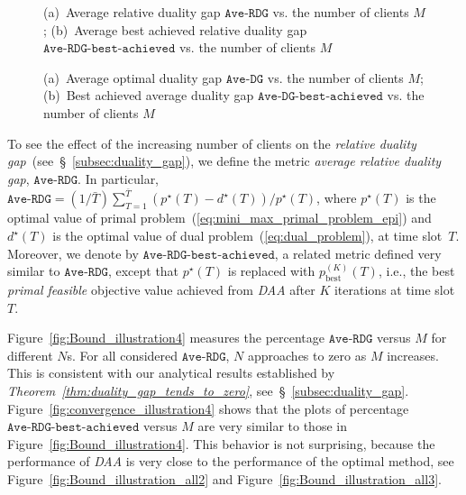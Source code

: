 \documentclass[journal, 10pt, twocolumn]{IEEEtran}
\begin{document}
\begin{figure}[t]
\centering
{}
\goodgap
{}\vspace{-2mm}
\caption{(a)~Average relative duality gap $\texttt{Ave-RDG}$ vs. the number of clients $M$; (b)~Average best achieved relative duality gap $\texttt{Ave-RDG-best-achieved}$ vs. the number of clients $M$}
\label{fig:Bound_illustration_all4}
\vspace{-0.4cm}
\end{figure}
\begin{figure}[t]
\centering
{}
\goodgap
{}\vspace{-2mm}
\caption{(a)~Average optimal duality gap $\texttt{Ave-DG}$ vs. the number of clients $M$; (b)~Best achieved average duality gap $\texttt{Ave-DG-best-achieved}$ vs. the number of clients $M$}
\label{fig:Bound_illustration_all5}
\vspace{-0.4cm}
\end{figure}

To see the effect of the increasing number of clients on the \emph{relative duality gap}~(see~\S~\ref{subsec:duality_gap}), we define the metric \emph{average relative duality gap}, $\texttt{Ave-RDG}$. In particular, $\texttt{Ave-RDG}= (1/\bar T)\sum_{T=1}^{\bar T}(p^\star(T)-d^\star(T))/p^\star(T)$, where $p^\star(T)$ is the optimal value of primal problem~(\ref{eq:mini_max_primal_problem_epi}) and $d^\star(T)$ is the optimal value of dual problem~(\ref{eq:dual_problem}), at time slot~$T$. Moreover, we denote by $\texttt{Ave-RDG-best-achieved}$, a related metric defined very similar to $\texttt{Ave-RDG}$, except that $p^\star(T)$ is replaced with $p^{(K)}_{\mathrm{best}}(T)$, i.e., the best \emph{primal feasible} objective value achieved from \emph{DAA} after $K$ iterations at time slot $T$.


Figure~\ref{fig:Bound_illustration4} measures the percentage $\texttt{Ave-RDG}$ versus $M$ for different $N$s. For all considered $\texttt{Ave-RDG}$, $N$ approaches to zero as $M$ increases. This is consistent with our analytical results established by \emph{Theorem~\ref{thm:duality_gap_tends_to_zero}}, see~\S~\ref{subsec:duality_gap}. Figure~\ref{fig:convergence_illustration4} shows that the plots of percentage $\texttt{Ave-RDG-best-achieved}$ versus $M$ are very
similar to those in Figure~\ref{fig:Bound_illustration4}. This behavior is not surprising, because the performance of \emph{DAA} is very close to the performance of the optimal method, see Figure~\ref{fig:Bound_illustration_all2} and Figure~\ref{fig:Bound_illustration_all3}.
\end{document}
